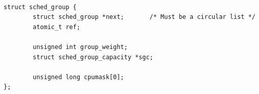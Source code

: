 \documentclass[a4paper,12pt]{article}
\begin{document}
%
%
%
%
%
%
%
%

\begin{verbatim} 

struct sched_group {
        struct sched_group *next;       /* Must be a circular list */
        atomic_t ref;

        unsigned int group_weight;
        struct sched_group_capacity *sgc;

        unsigned long cpumask[0];
};

\end{verbatim} 
\end{document}
